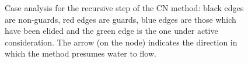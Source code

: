 \documentclass[preprint,a4paper]{elsarticle}
\newenvironment{stusubfig}[1]
{
	\begin{figure}[#1]
	\begin{center}
}
{
	\end{center}
	\end{figure}
}
\begin{document}
\begin{stusubfig}{p}
	\hspace{4mm}%
\caption[Case analysis for the recursive step of the CN method]{Case analysis for the recursive step of the CN method: black edges are non-guards, red edges are guards, blue edges are those which have been elided and the green edge is the one under active consideration. The arrow (on the node) indicates the direction in which the method presumes water to flow.}
\label{fig:segmentation-waterfall-nicholls-cases}
\end{stusubfig}
\end{document}
